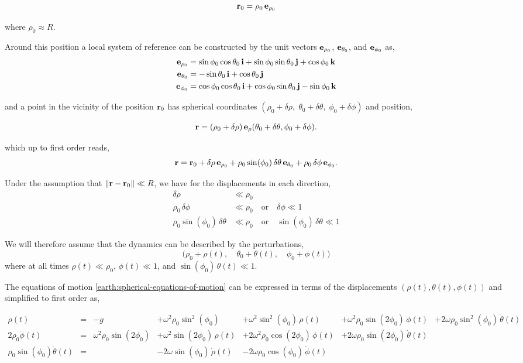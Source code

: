 \documentclass[12pt]{article}
\begin{document}
\[
  \vb{r}_0 = \rho_0\,\vb{e}_{\rho_0}
\]

where $\rho_0 \approx R$.

Around this position a local system of reference can be constructed by the unit vectors
$\vb{e}_{\rho_0}$, $\vb{e}_{\theta_0}$, and $\vb{e}_{\phi_0}$ as,
\begin{align}
  \vb{e}_{\rho_0}   &= \sin\phi_0\cos\theta_0\,\vb{i} + \sin\phi_0\sin\theta_0\,\vb{j} + \cos\phi_0\,\vb{k} \\
  \vb{e}_{\theta_0} &= -\sin\theta_0\,\vb{i} + \cos\theta_0\,\vb{j} \\
  \vb{e}_{\phi_0}   &= \cos\phi_0\cos\theta_0\,\vb{i} + \cos\phi_0\sin\theta_0\,\vb{j} - \sin\phi_0\,\vb{k}
\end{align}

and a point in the vicinity of the position $\vb{r}_0$ has spherical coordinates
$(\rho_0+\delta\rho,\;\theta_0+\delta\theta,\;\phi_0+\delta\phi)$ and position,

 
\[
  \vb{r}
  =
  (\rho_0+\delta\rho)\,
  \vb{e}_{\rho}
  (\theta_0+\delta\theta,\phi_0+\delta\phi).
\]


which up to first order reads,
\[
  \vb{r} = \vb{r}_0
    + \delta\rho\,\vb{e}_{\rho_0}
    + \rho_0\sin(\phi_0)\,\delta\theta\,\vb{e}_{\theta_0}
    + \rho_0\,\delta\phi\,\vb{e}_{\phi_0}.
\]

Under the assumption that $\|\vb{r} - \vb{r}_0\| \ll R$, we have for the displacements in
each direction,
\begin{align}
  \delta\rho &\ll \rho_0 \\
  \rho_0\,\delta\phi &\ll \rho_0 \quad\text{or}\quad \delta\phi \ll 1 \\
  \rho_0\sin(\phi_0)\,\delta\theta &\ll \rho_0 \quad\text{or}\quad \sin(\phi_0)\,\delta\theta \ll 1
\end{align}

We will therefore assume that the dynamics can be described by the perturbations,
\[
  \bigl(\rho_0 + \rho(t),\quad \theta_0 + \theta(t),\quad \phi_0 + \phi(t)\bigr)
\]
where at all times $\rho(t) \ll \rho_0$, $\phi(t) \ll 1$, and
$\sin(\phi_0)\,\theta(t) \ll 1$.

The equations of motion \eqref{earth:spherical-equations-of-motion} can be expressed in terms of the
displacements $(\rho(t), \theta(t), \phi(t))$ and simplified to first order as,


\begin{equation}
  \begin{alignedat}{6}
       \ddot\rho(t) &=& -g
      &+\omega^2\rho_0\sin^2(\phi_0)
      &+\omega^2\sin^2(\phi_0)\,\rho(t)
      &+\omega^2\rho_0\sin(2\phi_0)\,\phi(t)
      &+2\omega\rho_0\sin^2(\phi_0)\,\dot\theta(t) \\
    2\rho_0\ddot\phi(t) &=& \omega^2\rho_0\sin(2\phi_0)
      &+\omega^2\sin(2\phi_0)\,\rho(t)
      &+2\omega^2\rho_0\cos(2\phi_0)\,\phi(t)
      &+2\omega\rho_0\sin(2\phi_0)\,\dot\theta(t) \\
    \rho_0\sin(\phi_0)\ddot\theta(t) &=&
      &-2\omega\sin(\phi_0)\,\dot\rho(t)
      &-2\omega\rho_0\cos(\phi_0)\,\dot\phi(t)
  \end{alignedat}
  \label{earth:linearized-spherical-equations}
\end{equation}
\end{document}
